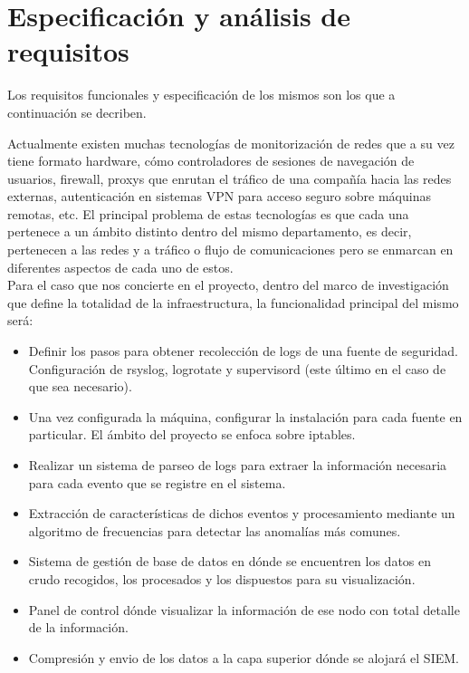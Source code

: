 \chapter{Especificación y análisis de requisitos}
\label{chap:requisitos}

Los requisitos funcionales y especificación de los mismos son los que a continuación se decriben.

Actualmente existen muchas tecnologías de monitorización de redes que a su vez tiene formato hardware, cómo controladores de sesiones de navegación de usuarios, firewall, proxys que enrutan el tráfico de una compañía hacia las redes externas, autenticación en sistemas VPN para acceso seguro sobre máquinas remotas, etc. El principal problema de estas tecnologías es que cada una pertenece a un ámbito distinto dentro del mismo departamento, es decir, pertenecen a las redes y a tráfico o flujo de comunicaciones pero se enmarcan en diferentes aspectos de cada uno de estos. \\

Para el caso que nos concierte en el proyecto, dentro del marco de investigación que define la totalidad de la infraestructura, la funcionalidad principal del mismo será:

\begin{itemize}
\item Definir los pasos para obtener recolección de logs de una fuente de seguridad. Configuración de rsyslog, logrotate y supervisord (este último en el caso de que sea necesario).
\item Una vez configurada la máquina, configurar la instalación para cada fuente en particular. El ámbito del proyecto se enfoca sobre iptables.
\item Realizar un sistema de parseo de logs para extraer la información necesaria para cada evento que se registre en el sistema.
\item Extracción de características de dichos eventos y procesamiento mediante un algoritmo de frecuencias para detectar las anomalías más comunes.
\item Sistema de gestión de base de datos en dónde se encuentren los datos en crudo recogidos, los procesados y los dispuestos para su visualización.
\item Panel de control dónde visualizar la información de ese nodo con total detalle de la información.
\item Compresión y envio de los datos a la capa superior dónde se alojará el SIEM.
\end{itemize}


